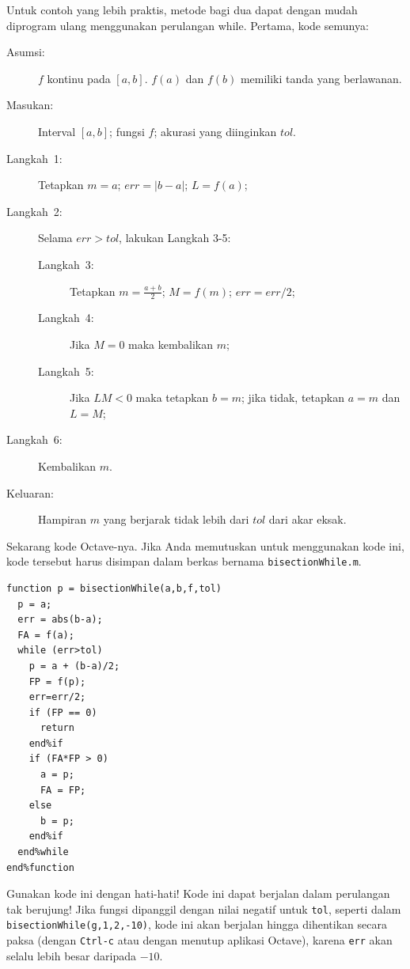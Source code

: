 Untuk contoh yang lebih praktis, metode bagi dua dapat dengan mudah
diprogram ulang menggunakan perulangan while. Pertama, kode semunya:

\begin{pseudocode} 
\begin{description}
\item [{Asumsi:}] $f$ kontinu pada $[a,b]$. $f(a)$ dan $f(b)$ memiliki
tanda yang berlawanan.
\item [{Masukan:}] Interval $[a,b]$; fungsi $f$; akurasi yang diinginkan
$tol$.
\item [{Langkah~1:}] Tetapkan $m=a$; $err=|b-a|$; $L=f(a)$;
\item [{Langkah~2:}] Selama $err>tol$, lakukan Langkah 3-5:

\begin{description}
\item [{Langkah~3:}] Tetapkan $m=\frac{a+b}{2}$; $M=f(m)$; $err=err/2$;
\item [{Langkah~4:}] Jika $M=0$ maka kembalikan $m$;
\item [{Langkah~5:}] Jika $LM<0$ maka tetapkan $b=m$; jika tidak, tetapkan
$a=m$ dan $L=M$;
\end{description}
\item [{Langkah~6:}] Kembalikan $m$.
\item [{Keluaran:}] Hampiran $m$ yang berjarak tidak lebih dari $tol$
dari akar eksak.
\end{description}
\end{pseudocode}  

\noindent Sekarang kode Octave-nya. Jika Anda memutuskan untuk menggunakan
kode ini, kode tersebut harus disimpan dalam berkas bernama \texttt{bisectionWhile.m}.

\begin{verbatim}
function p = bisectionWhile(a,b,f,tol)
  p = a;
  err = abs(b-a);
  FA = f(a);
  while (err>tol)
    p = a + (b-a)/2;
    FP = f(p);
    err=err/2;
    if (FP == 0)
      return
    end%if
    if (FA*FP > 0)
      a = p;
      FA = FP;
    else
      b = p;
    end%if
  end%while
end%function 
\end{verbatim} Gunakan kode ini dengan hati-hati! Kode ini dapat berjalan dalam
perulangan tak berujung! Jika fungsi dipanggil dengan nilai negatif
untuk \texttt{tol}, seperti dalam \texttt{bisectionWhile(g,1,2,-10)},
kode ini akan berjalan hingga dihentikan secara paksa (dengan \texttt{Ctrl-c}
atau dengan menutup aplikasi Octave), karena \texttt{err} akan selalu
lebih besar daripada $-10$.

